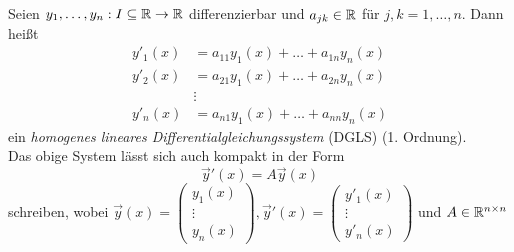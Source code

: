 \begin{definition}
    Seien $y_1,\dots,y_n: I \subseteq \mathbb{R} \to \mathbb{R}$ differenzierbar und $a_{jk} \in \mathbb{R}$ für $j,k = 1,\dots,n$.
    Dann heißt
    \begin{equation*}
        \begin{aligned}
            y'_1(x) &= a_{11} y_1(x) + \dots + a_{1n} y_n(x)\\
            y'_2(x) &= a_{21} y_1(x) + \dots + a_{2n} y_n(x)\\
            &\vdots\\
            y'_n(x) &= a_{n1} y_1(x) + \dots + a_{nn} y_n(x)
        \end{aligned}
    \end{equation*}
    ein \emph{homogenes lineares Differentialgleichungssystem} (DGLS) (1. Ordnung).\\
    Das obige System lässt sich auch kompakt in der Form
    \begin{equation}\tag{DGLS}\label{eq:dgls}
        \vec{y}'(x) = A \vec{y}(x)
    \end{equation}
    schreiben, wobei $\vec{y}(x) = \begin{pmatrix} y_1(x)\\ \vdots\\ y_n(x) \end{pmatrix}, \vec{y}'(x) = \begin{pmatrix} y'_1(x)\\ \vdots\\ y'_n(x) \end{pmatrix}$
    und $A \in \mathbb{R}^{n \times n}$
\end{definition}
